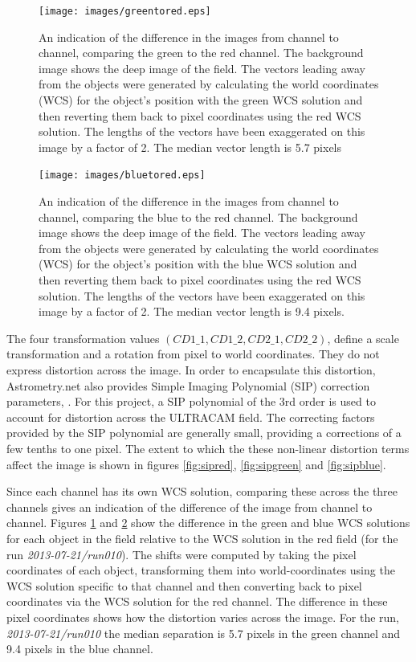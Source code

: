 \begin{figure}
  \centering
  \texttt{[image: images/greentored.eps]}
  \caption{An indication of the difference in the images from channel to channel,  comparing the green to the red channel. The background image shows the deep image of the field. The vectors leading away from the objects were generated by calculating the world coordinates (WCS) for the object's position with the green WCS solution and then reverting them back to pixel coordinates using the red WCS solution. The lengths of the vectors have been exaggerated on this image by a factor of 2. The median vector length is 5.7 pixels }
\label{fig:greentored}
\end{figure}
  
\begin{figure}
  \centering
  \texttt{[image: images/bluetored.eps]}
  \caption{An indication of the difference in the images from channel to channel, comparing the blue to the red channel. The background image shows the deep image of the field. The vectors leading away from the objects were generated by calculating the world coordinates (WCS) for the object's position with the blue WCS solution and then reverting them back to pixel coordinates using the red WCS solution. The lengths of the vectors have been exaggerated on this image by a factor of 2. The median vector length is 9.4 pixels.}
\label{fig:bluetored}
\end{figure}

The four transformation values $(CD1\_1, CD1\_2, CD2\_1, CD2\_2)$, define a scale transformation and a rotation from pixel to world coordinates. They do not express distortion across the image. In order to encapsulate this distortion, Astrometry.net also provides Simple Imaging Polynomial (SIP) correction parameters, \citep{sippolynomial}. For this project, a SIP polynomial of the 3rd order is used to account for distortion across the ULTRACAM field. The correcting factors provided by the SIP polynomial are generally small, providing a corrections of a few tenths to one pixel. The extent to which the these non-linear distortion terms affect the image is shown in figures \ref{fig:sipred}, \ref{fig:sipgreen} and \ref{fig:sipblue}. 

Since each channel has its own WCS solution, comparing these across the three channels gives an indication of the difference of the image from channel to channel. Figures \ref{fig:greentored} and \ref{fig:bluetored} show the difference in the green and blue WCS solutions for each object in the field relative to the WCS solution in the red field (for the run \emph{2013-07-21/run010}). The shifts were computed by taking the pixel coordinates of each object, transforming them into world-coordinates using the WCS solution specific to that channel and then converting back to pixel coordinates via the WCS solution for the red channel. The difference in these pixel coordinates shows how the distortion varies across the image.  For the run, \emph{2013-07-21/run010} the median separation is 5.7 pixels in the green channel and 9.4 pixels in the blue channel. 


